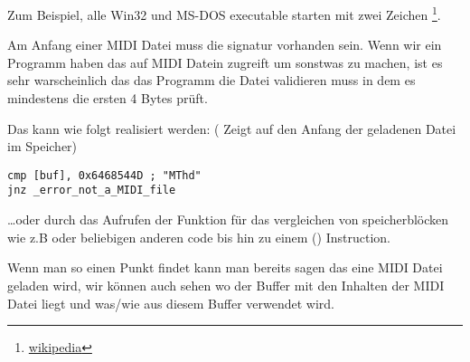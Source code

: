 Zum Beispiel, alle Win32 und MS-DOS executable starten mit zwei Zeichen \footnote{\href{http://go.yurichev.com/17113}{wikipedia}}.



Am Anfang einer MIDI Datei muss die  signatur vorhanden sein.
Wenn wir ein Programm haben das auf MIDI Datein zugreift um sonstwas zu machen,
ist es sehr warscheinlich das das Programm die Datei validieren muss in dem es
mindestens die ersten 4 Bytes prüft.


Das kann wie folgt realisiert werden: %
( Zeigt auf den Anfang der geladenen Datei im Speicher) 


\begin{lstlisting}[style=customasmx86]
cmp [buf], 0x6468544D ; "MThd"
jnz _error_not_a_MIDI_file
\end{lstlisting}


\dots oder durch das Aufrufen der Funktion für das vergleichen von speicherblöcken wie z.B  oder 
beliebigen anderen code bis hin zu einem  () Instruction.


Wenn man so einen Punkt findet kann man bereits sagen das eine MIDI Datei geladen wird, %
wir können auch sehen wo der Buffer mit den Inhalten der MIDI Datei liegt und was/wie aus diesem
Buffer verwendet wird.


